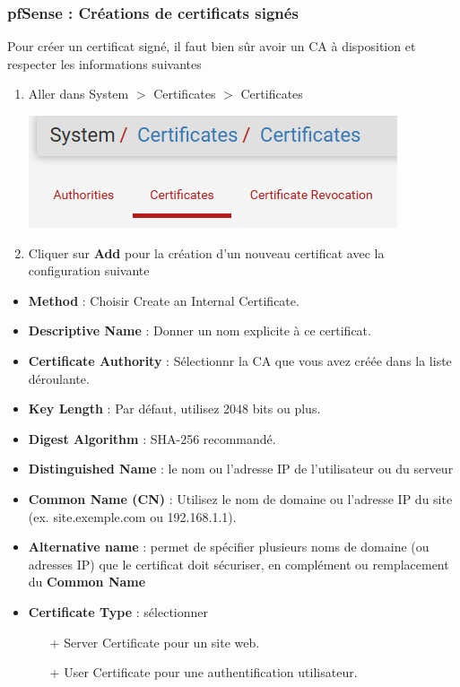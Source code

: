 \documentclass[french, 12pt]{article}%
\newcommand{\itemE}{\item[$\bullet$]}
\begin{document}
\subsubsection{pfSense : Créations de certificats signés}

Pour créer un certificat signé, il faut bien sûr avoir un CA à disposition et respecter les informations suivantes


\begin{enumerate}
\item Aller dans System $>$ Certificates $>$ Certificates

\begin{center}
\includegraphics[scale=0.7]{./ressource/certificatPfsense}
\end{center}

\item Cliquer sur \textbf{Add} pour la création d'un nouveau certificat avec la configuration suivante
\end{enumerate}

\begin{itemize}
\itemE \textbf{Method} : Choisir Create an Internal Certificate.
\itemE \textbf{Descriptive Name} : Donner un nom explicite à ce certificat.
\itemE \textbf{Certificate Authority} : Sélectionnr la CA que vous avez créée dans la liste déroulante.
\itemE \textbf{Key Length} : Par défaut, utilisez 2048 bits ou plus.
\itemE \textbf{Digest Algorithm} : SHA-256 recommandé.

\itemE \textbf{Distinguished Name} : le nom ou l'adresse IP de l'utilisateur ou du serveur
\itemE \textbf{Common Name (CN)} : Utilisez le nom de domaine ou l'adresse IP du site (ex. site.exemple.com ou 192.168.1.1).
\itemE \textbf{Alternative name} : permet de spécifier plusieurs noms de domaine (ou adresses IP) que le certificat doit sécuriser, en complément ou remplacement du \textbf{Common Name}
\itemE \textbf{Certificate Type} : sélectionner
	\begin{itemize}
	\item[+] Server Certificate pour un site web.
	\item[+] User Certificate pour une authentification utilisateur.
	\end{itemize}

\end{itemize}
\end{document}
